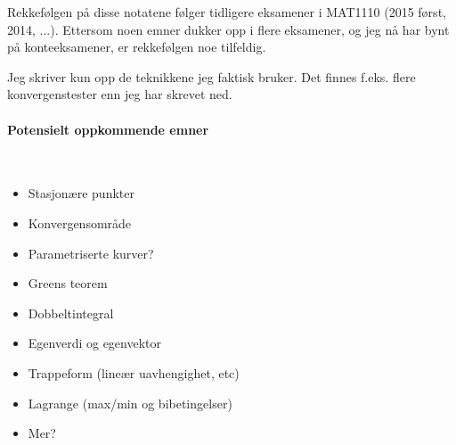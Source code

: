 Rekkefølgen på disse notatene følger tidligere eksamener
i MAT1110 (2015 først, 2014, ...).
Ettersom noen emner dukker opp i flere eksamener, og jeg nå har bynt på
konteeksamener, er rekkefølgen noe tilfeldig.

Jeg skriver kun opp de teknikkene jeg faktisk bruker.
Det finnes f.eks. flere konvergenstester enn jeg har skrevet ned.

\paragraph{Potensielt oppkommende emner} \mbox{} \\
\begin{itemize}
  \item Stasjonære punkter
  \item Konvergensområde
  \item Parametriserte kurver?
  \item Greens teorem
  \item Dobbeltintegral
  \item Egenverdi og egenvektor
  \item Trappeform (lineær uavhengighet, etc)
  \item Lagrange (max/min og bibetingelser)
  \item Mer?
\end{itemize}
